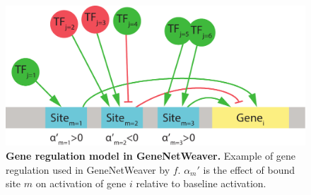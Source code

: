 
\begin{figure}[ht]
  \centering
  \includegraphics[width=\textwidth]{theory/fig/GeneWeaverRegulation.pdf}
  \caption{\textbf{Gene regulation model in GeneNetWeaver.} Example of gene regulation used in GeneNetWeaver by $f$. 
  $\alpha_m'$ is the effect of bound site $m$ on activation of gene $i$ relative to baseline activation. 
  }
  \label{fig:gnw_regulation}
\end{figure}


